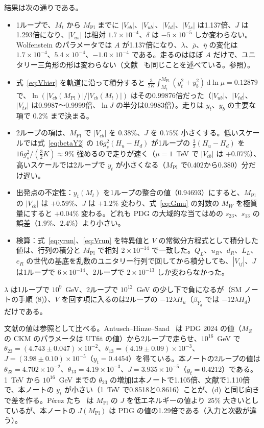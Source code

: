 \documentclass[a4paper,10pt]{ltjsarticle}
\newcommand{\dd}{\mathrm{d}}
\begin{document}
結果は次の通りである。
\begin{itemize}
\item[(a)] 1ループで、$M_t$ から $M_{\mathrm{Pl}}$ までに $|V_{cb}|$、$|V_{ub}|$、$|V_{td}|$、$|V_{ts}|$ は1.137倍、$J$ は1.293倍になり、$|V_{us}|$ は相対 $1.7\times10^{-4}$、$\delta$ は $-5\times10^{-5}$ しか変わらない。Wolfenstein のパラメータでは $A$ が1.137倍になり、$\lambda$、$\bar\rho$、$\bar\eta$ の変化は $1.7\times10^{-4}$、$5.4\times10^{-4}$、$-1.0\times10^{-4}$ である。走るのはほぼ $A$ だけで、ユニタリー三角形の形は変わらない（文献~\cite{girt22} も同じことを述べている。参照）。
\item[(b)] 式~\eqref{eq:Vhier} を軌道に沿って積分すると $\frac3{2K}\int_{M_t}^{M_{\mathrm{Pl}}}(y_t^2+y_b^2)\,\dd\ln\mu=0.12879$ で、$\ln(|V_{cb}(M_{\mathrm{Pl}})|/|V_{cb}(M_t)|)$ はその0.99876倍だった（$|V_{ub}|$、$|V_{td}|$、$|V_{ts}|$ は0.9987〜0.9999倍、$\ln J$ の半分は0.9983倍）。走りは $y_t$、$y_b$ の主要な項で $0.2\%$ まで決まる。
\item[(c)] 2ループの項は、$M_{\mathrm{Pl}}$ で $|V_{cb}|$ を $0.38\%$、$J$ を $0.75\%$ 小さくする。低いスケールでは式~\eqref{eq:betaY2} の $16g_s^2(H_u-H_d)$ が1ループの $\frac32(H_u-H_d)$ を $16g_s^2/(\frac32K)\approx9\%$ 強めるので走りが速く（$\mu=1$~TeV で $|V_{cb}|$ は $+0.07\%$）、高いスケールでは2ループで $y_t$ が小さくなる（$M_{\mathrm{Pl}}$ で0.402から0.380）分だけ遅い。
\item[(d)] 出発点の不定性：$y_t(M_t)$ を1ループの整合の値（0.94693）にすると、$M_{\mathrm{Pl}}$ の $|V_{cb}|$ は $+0.59\%$、$J$ は $+1.2\%$ 変わり、式~\eqref{eq:Gmu} の対数の $M_W$ を極質量にすると $+0.04\%$ 変わる。どれも PDG の大域的な当てはめの $s_{23}$、$s_{13}$ の誤差（$1.9\%$、$2.4\%$）より小さい。
\item[(e)] 検算：式~\eqref{eq:yrun}、\eqref{eq:Vrun} を特異値と $V$ の常微分方程式として積分した値は、行列の積分と $M_{\mathrm{Pl}}$ で相対 $2\times10^{-14}$ で一致した。$Q_L$、$u_R$、$d_R$、$L_L$、$e_R$ の世代の基底を乱数のユニタリー行列で回してから積分しても、$|V_{ij}|$、$J$ は1ループで $6\times10^{-14}$、2ループで $2\times10^{-13}$ しか変わらなかった。
\end{itemize}
$\lambda$ は1ループで $10^9$~GeV、2ループで $10^{12}$~GeV の少し下で負になるが（SM ノートの手順 (8)）、$V$ を回す項に入るのは2ループの $-12\lambda H_u$（$\beta_{Y_d}$ では $-12\lambda H_d$）だけである。

文献の値は参照として比べる。Antusch--Hinze--Saad~\cite{ahs25} は PDG 2024 の値（$M_Z$ の CKM のパラメータは UTfit の値）から2ループで走らせ、$10^{16}$~GeV で $\theta_{23}=(4.743\pm0.047)\times10^{-2}$、$\theta_{13}=(4.19\pm0.09)\times10^{-3}$、$J=(3.98\pm0.10)\times10^{-5}$（$y_t=0.4454$）を得ている。本ノートの2ループの値は $\theta_{23}=4.702\times10^{-2}$、$\theta_{13}=4.19\times10^{-3}$、$J=3.935\times10^{-5}$（$y_t=0.4212$）である。1~TeV から $10^{16}$~GeV までの $\theta_{23}$ の増加は本ノートで1.105倍、文献で1.110倍で、本ノートの $y_t$ が小さい（1~TeV で0.8518と0.8616）ことが、(d) と同じ向きで差を作る。Pérez たち~\cite{pkjm14} は $M_{\mathrm{Pl}}$ の $J$ を低エネルギーの値より $25\%$ 大きいとしているが、本ノートの $J(M_{\mathrm{Pl}})$ は PDG の値の1.29倍である（入力と次数が違う）。
\end{document}
